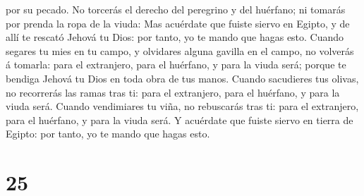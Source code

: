 por su pecado.  No torcerás el derecho del peregrino y
del huérfano; ni tomarás por prenda la ropa de la viuda: 
Mas acuérdate que fuiste siervo en Egipto, y de allí te rescató Jehová
tu Dios: por tanto, yo te mando que hagas esto.  Cuando
segares tu mies en tu campo, y olvidares alguna gavilla en el campo, no
volverás á tomarla: para el extranjero, para el huérfano, y para la
viuda será; porque te bendiga Jehová tu Dios en toda obra de tus manos.
 Cuando sacudieres tus olivas, no recorrerás las ramas
tras ti: para el extranjero, para el huérfano, y para la viuda será.
 Cuando vendimiares tu viña, no rebuscarás tras ti: para
el extranjero, para el huérfano, y para la viuda será.  Y
acuérdate que fuiste siervo en tierra de Egipto: por tanto, yo te mando
que hagas esto.

\hypertarget{section-24}{%
\section{25}\label{section-24}}

